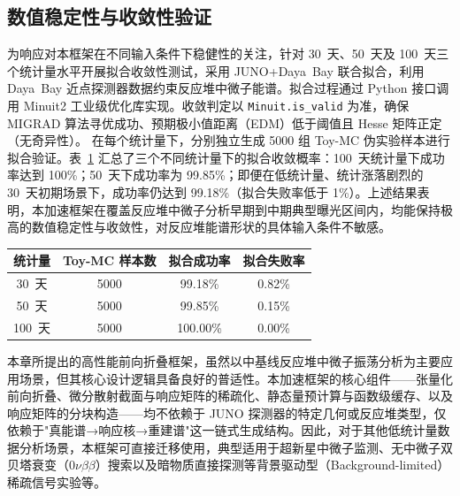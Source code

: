 \subsection{数值稳定性与收敛性验证}
\label{sec:convergence}

为响应对本框架在不同输入条件下稳健性的关注，针对 30~天、50~天及 100~天三个统计量水平开展拟合收敛性测试，采用 JUNO+Daya~Bay 联合拟合，利用 Daya~Bay 近点探测器数据约束反应堆中微子能谱。拟合过程通过 Python 接口调用 Minuit2 工业级优化库实现。收敛判定以 \texttt{Minuit.is\_valid} 为准，确保 MIGRAD 算法寻优成功、预期极小值距离（EDM）低于阈值且 Hesse 矩阵正定（无奇异性）。
在每个统计量下，分别独立生成 5000 组 Toy-MC 伪实验样本进行拟合验证。表~\ref{tab:convergence} 汇总了三个不同统计量下的拟合收敛概率：100~天统计量下成功率达到 100\%；50~天下成功率为 99.85\%；即便在低统计量、统计涨落剧烈的 30~天初期场景下，成功率仍达到 99.18\%（拟合失败率低于 1\%）。上述结果表明，本加速框架在覆盖反应堆中微子分析早期到中期典型曝光区间内，均能保持极高的数值稳定性与收敛性，对反应堆能谱形状的具体输入条件不敏感。

\begin{table}[htbp]
\centering
{}
\label{tab:convergence}
\begin{tabular}{cccc}
\hline
统计量 & Toy-MC 样本数 & 拟合成功率 & 拟合失败率 \\
\hline
30~天  & 5000 & 99.18\%  & 0.82\% \\
50~天  & 5000 & 99.85\%  & 0.15\% \\
100~天 & 5000 & 100.00\% & 0.00\% \\
\hline
\end{tabular}
\end{table}

本章所提出的高性能前向折叠框架，虽然以中基线反应堆中微子振荡分析为主要应用场景，但其核心设计逻辑具备良好的普适性。本加速框架的核心组件——张量化前向折叠、微分散射截面与响应矩阵的稀疏化、静态量预计算与函数级缓存、以及响应矩阵的分块构造——均不依赖于 JUNO 探测器的特定几何或反应堆类型，仅依赖于"真能谱→响应核→重建谱"这一链式生成结构。因此，对于其他低统计量数据分析场景，本框架可直接迁移使用，典型适用于超新星中微子监测、无中微子双贝塔衰变（$0\nu\beta\beta$）搜索以及暗物质直接探测等背景驱动型（Background-limited）稀疏信号实验等。


